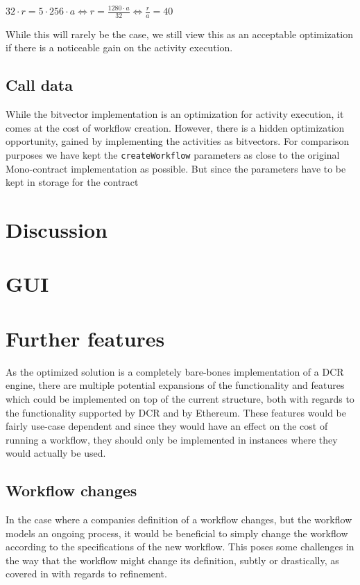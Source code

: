 \documentclass{article}
\begin{document}
		\begin{center}		
			$32 \cdot r = 5 \cdot 256 \cdot a \iff r = \frac{1280 \cdot a}{32} \iff \frac{r}{a} = 40$
		\end{center}
		
		While this will rarely be the case, we still view this as an acceptable optimization if there is a noticeable gain on the activity execution.

		\subsection{Call data}
		While the bitvector implementation is an optimization for activity execution, it comes at the cost of workflow creation. 
		However, there is a hidden optimization opportunity, gained by implementing the activities as bitvectors. 
		For comparison purposes we have kept the \texttt{createWorkflow} parameters as close to the original Mono-contract implementation as possible. 
		But since the parameters have to be kept in storage for the contract

	\section{Discussion}

	\section{GUI}

	\section{Further features}
	As the optimized solution is a completely bare-bones implementation of a DCR engine, there are multiple potential expansions of the functionality and features which could be implemented on top of the current structure, both with regards to the functionality supported by DCR and by Ethereum.
	These features would be fairly use-case dependent and since they would have an effect on the cost of running a workflow, they should only be implemented in instances where they would actually be used.

		\subsection{Workflow changes}
		\label{sec:workflow-changes}

		In the case where a companies definition of a workflow changes, but the workflow models an ongoing process, it would be beneficial to simply change the workflow according to the specifications of the new workflow.
		This poses some challenges in the way that the workflow might change its definition, subtly or drastically, as covered in \cite{hierarchical-declarative-modelling} with regards to refinement.
		
\end{document}
